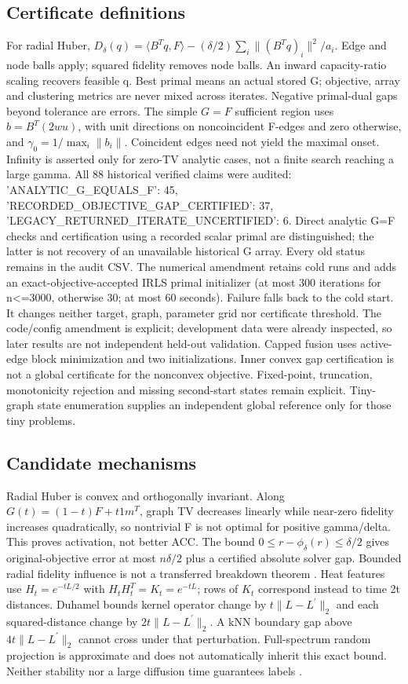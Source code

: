 \subsection{Certificate definitions}
For radial Huber, $D_\delta(q)=\langle B^Tq,F\rangle-(\delta/2)\sum_i\|(B^Tq)_i\|^2/a_i$. Edge and node balls apply; squared fidelity removes node balls. An inward capacity-ratio scaling recovers feasible q. Best primal means an actual stored G; objective, array and clustering metrics are never mixed across iterates. Negative primal-dual gaps beyond tolerance are errors.
The simple $G=F$ sufficient region uses $b=B^T(2wu)$, with unit directions on noncoincident F-edges and zero otherwise, and $\gamma_0=1/\max_i\|b_i\|$. Coincident edges need not yield the maximal onset. Infinity is asserted only for zero-TV analytic cases, not a finite search reaching a large gamma.
All 88 historical verified claims were audited: {'ANALYTIC\_G\_EQUALS\_F': 45, 'RECORDED\_OBJECTIVE\_GAP\_CERTIFIED': 37, 'LEGACY\_RETURNED\_ITERATE\_UNCERTIFIED': 6}. Direct analytic G=F checks and certification using a recorded scalar primal are distinguished; the latter is not recovery of an unavailable historical G array. Every old status remains in the audit CSV.
The numerical amendment retains cold runs and adds an exact-objective-accepted IRLS primal initializer (at most 300 iterations for n<=3000, otherwise 30; at most 60 seconds). Failure falls back to the cold start. It changes neither target, graph, parameter grid nor certificate threshold. The code/config amendment is explicit; development data were already inspected, so later results are not independent held-out validation.
Capped fusion uses active-edge block minimization and two initializations. Inner convex gap certification is not a global certificate for the nonconvex objective. Fixed-point, truncation, monotonicity rejection and missing second-start states remain explicit. Tiny-graph state enumeration supplies an independent global reference only for those tiny problems.
\subsection{Candidate mechanisms}
Radial Huber is convex and orthogonally invariant. Along $G(t)=(1-t)F+t1m^T$, graph TV decreases linearly while near-zero fidelity increases quadratically, so nontrivial F is not optimal for positive gamma/delta. This proves activation, not better ACC. The bound $0\le r-\phi_\delta(r)\le\delta/2$ gives original-objective error at most $n\delta/2$ plus a certified absolute solver gap. Bounded radial fidelity influence is not a transferred breakdown theorem \citep{sun2025resistant}.
Heat features use $H_t=e^{-tL/2}$ with $H_tH_t^T=K_t=e^{-tL}$; rows of $K_t$ correspond instead to time 2t distances. Duhamel bounds kernel operator change by $t\|L-L^\prime\|_2$ and each squared-distance change by $2t\|L-L^\prime\|_2$. A kNN boundary gap above $4t\|L-L^\prime\|_2$ cannot cross under that perturbation. Full-spectrum random projection is approximate and does not automatically inherit this exact bound. Neither stability nor a large diffusion time guarantees labels \citep{coifman2006diffusion,gasteiger2019diffusion}.
